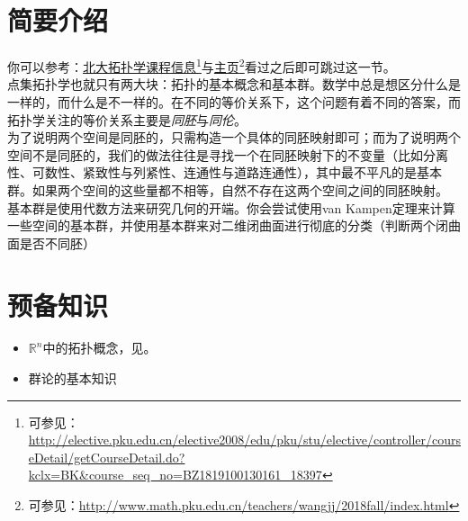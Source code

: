 \documentclass[11pt,A4paper,oneside]{amsart}
\numberwithin{equation}{section}
\theoremstyle{plain}
\theoremstyle{plain}
\numberwithin{equation}{section}
\theoremstyle{remark}
\begin{document}
\section{简要介绍}
你可以参考：\href{http://elective.pku.edu.cn/elective2008/edu/pku/stu/elective/controller/courseDetail/getCourseDetail.do?kclx=BK&course_seq_no=BZ1819100130161_18397}{北大拓扑学课程信息}\footnote{可参见：\url{http://elective.pku.edu.cn/elective2008/edu/pku/stu/elective/controller/courseDetail/getCourseDetail.do?kclx=BK\&course\_seq\_no=BZ1819100130161\_18397}}与\href{http://www.math.pku.edu.cn/teachers/wangjj/2018fall/index.html}{主页}\footnote{可参见：\url{http://www.math.pku.edu.cn/teachers/wangjj/2018fall/index.html}}看过之后即可跳过这一节。\\
点集拓扑学也就只有两大块：拓扑的基本概念和基本群。数学中总是想区分什么是一样的，而什么是不一样的。在不同的等价关系下，这个问题有着不同的答案，而拓扑学关注的等价关系主要是\emph{同胚}与\emph{同伦}。\\
为了说明两个空间是同胚的，只需构造一个具体的同胚映射即可；而为了说明两个空间不是同胚的，我们的做法往往是寻找一个在同胚映射下的不变量（比如分离性、可数性、紧致性与列紧性、连通性与道路连通性），其中最不平凡的是基本群。如果两个空间的这些量都不相等，自然不存在这两个空间之间的同胚映射。\\
基本群是使用代数方法来研究几何的开端。你会尝试使用van Kampen定理来计算一些空间的基本群，并使用基本群来对二维闭曲面进行彻底的分类（判断两个闭曲面是否不同胚）




\section{预备知识}
\begin{itemize}
	\item $\mathbb{R}^n$中的拓扑概念，见\cite[Chapter 8]{CS12}。
    \item 群论的基本知识
\end{itemize}
\end{document}
